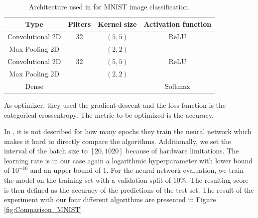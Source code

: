 \begin{table}[htbp!]
	\caption{ Architecture used in \cite{WU201926} for MNIST image classification. }
	\label{tab:architecture_MNIST_comp}
	\centering
	\begin{tabular}{| c c c c |} 
		\hline
		Type & Filters  & Kernel size & Activation function \\ 
		\hline
		Convolutional 2D & 32 & $ (5,5) $ & ReLU \\ 
		Max Pooling 2D &  & $ (2,2) $ &  \\ 
		Convolutional 2D & 32 & $ (5,5) $ & ReLU \\ 
		Max Pooling 2D &  & $ (2,2) $ &  \\ 
		Dense &  &  & Softmax \\ 
		\hline
	\end{tabular}
\end{table}

As optimizer, they used the gradient descent and the loss function is the categorical crossentropy. The metric to be optimized is the accuracy. \newline 

In \cite{WU201926}, it is not described for how many epochs they train the neural network which makes it hard to directly compare the algorithms. Additionally, we set the interval of the batch size to $ [20, 1020] $ because of hardware limitations. The learning rate is in our case again a logarithmic hyperparameter with lower bound of $ 10^{-16} $ and an upper bound of $ 1 $. For the neural network evaluation, we train the model on the training set with a validation split of $ 10\% $. The resulting score is then defined as the accuracy of the predictions of the test set. The result of the experiment with our four different algorithms are presented in Figure \ref{fig:Comparison_MNIST}.


